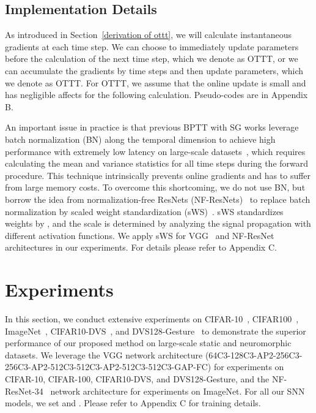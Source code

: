 \documentclass{article}
\begin{document}
\vspace{-2mm}
\subsection{Implementation Details}\label{implementation details}
\vspace{-2mm}

As introduced in Section~\ref{derivation of ottt}, we will calculate instantaneous gradients  at each time step. We can choose to immediately update parameters before the calculation of the next time step, which we denote as OTTT, or we can accumulate the gradients by  time steps and then update parameters, which we denote as OTTT. For OTTT, we assume that the online update is small and has negligible affects for the following calculation. Pseudo-codes are in Appendix B.

An important issue in practice is that previous BPTT with SG works leverage batch normalization (BN) along the temporal dimension to achieve high performance with extremely low latency on large-scale datasets~\cite{zheng2020going,li2021differentiable,fang2021deep,deng2021temporal}, which requires calculating the mean and variance statistics for all time steps during the forward procedure. This technique intrinsically prevents online gradients and has to suffer from large memory costs. To overcome this shortcoming, we do not use BN, but borrow the idea from normalization-free ResNets (NF-ResNets)~\cite{brock2021characterizing,brock2021high} to replace batch normalization by scaled weight standardization (sWS)~\cite{qiao2019weight}. sWS standardizes weights by , and the scale  is determined by analyzing the signal propagation with different activation functions. We apply sWS for VGG~\cite{simonyan2014very} and NF-ResNet architectures in our experiments. For details please refer to Appendix C.

\section{Experiments}\label{sec:exp}
\vspace{-2mm}

In this section, we conduct extensive experiments on CIFAR-10~\cite{krizhevsky2009learning}, CIFAR100~\cite{krizhevsky2009learning}, ImageNet~\cite{deng2009imagenet}, CIFAR10-DVS~\cite{li2017cifar10}, and DVS128-Gesture~\cite{amir2017low} to demonstrate the superior performance of our proposed method on large-scale static and neuromorphic datasets. We leverage the VGG network architecture (64C3-128C3-AP2-256C3-256C3-AP2-512C3-512C3-AP2-512C3-512C3-GAP-FC) for experiments on CIFAR-10, CIFAR-100, CIFAR10-DVS, and DVS128-Gesture, and the NF-ResNet-34~\cite{brock2021characterizing} network architecture for experiments on ImageNet. For all our SNN models, we set  and . Please refer to Appendix C for training details.
\end{document}
